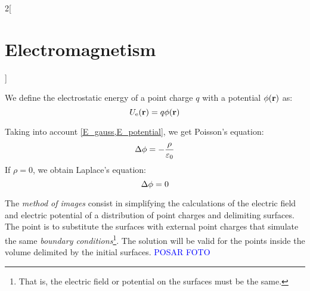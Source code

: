 \documentclass[../../../main_physics.tex]{subfiles}
\begin{document}
\begin{multicols}{2}[\section{Electromagnetism}]
\begin{definition}
    We define the electrostatic energy of a point charge $q$ with a potential $\phi(\boldsymbol{\mathrm{r}})$ as: $$U_\text{e}(\boldsymbol{\mathrm{r}})=q\phi(\boldsymbol{\mathrm{r}})$$
  \end{definition}
  \begin{proposition}
    Taking into account \cref{E_gauss,E_potential}, we get Poisson's equation: $$\Delta\phi=-\frac{\rho}{\varepsilon_0}$$ If $\rho=0$, we obtain Laplace's equation: $$\Delta\phi=0$$
  \end{proposition}
  \begin{proposition}
    The \emph{method of images} consist in simplifying the calculations of the electric field and electric potential of a distribution of point charges and delimiting surfaces. The point is to substitute the surfaces with external point charges that simulate the same \emph{boundary conditions}\footnote{That is, the electric field or potential on the surfaces must be the same.}. The solution will be valid for the points inside the volume delimited by the initial surfaces. \textcolor{blue}{POSAR FOTO}
  \end{proposition}

\end{multicols}
\end{document}
